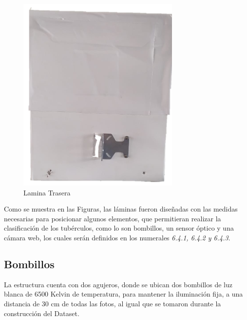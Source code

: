 \begin{figure}[ht]
\begin{minipage}[b]{0.25\linewidth}
		\includegraphics[width=\linewidth]{Figs/303.png}
		\caption{Lamina Trasera}
		\label{fig:trasera}
	\end{minipage}
\end{figure}

Como se muestra en las Figuras, las láminas fueron diseñadas con las medidas necesarias para posicionar algunos elementos, que permitieran realizar la clasificación de los tubérculos, como lo son bombillos, un sensor óptico y una cámara web, los cuales serán definidos en los numerales \textit{6.4.1, 6.4.2 y 6.4.3}.

\subsection{Bombillos}
La estructura cuenta con dos agujeros, donde se ubican dos bombillos de luz blanca de 6500 Kelvin de temperatura, para mantener la iluminación fija, a una distancia de 30 cm de todas las fotos, al igual que se tomaron durante la construcción del Dataset.
